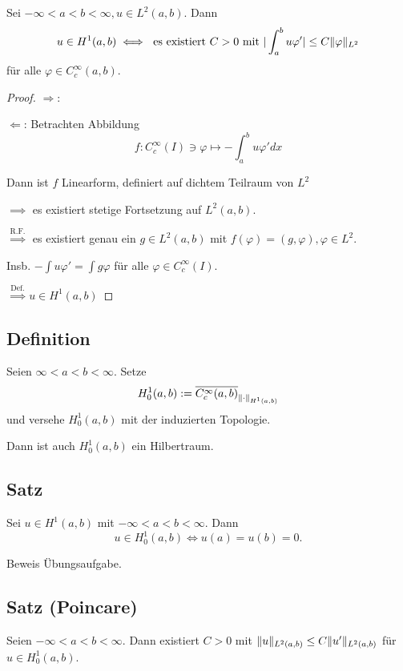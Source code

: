 Sei $-\infty < a < b < \infty, u \in L^2(a,b)$. 
Dann
$$
u \in H^1(a,b) \iff \text{ es existiert } C > 0 \text{ mit } |\int_a^b u\varphi'| \leq C \lVert \varphi \rVert_{L^2}$$
für alle $\varphi \in C_c^\infty(a,b)$.

\begin{proof}
  $\Rightarrow$: \checkmark

  $\Leftarrow$: Betrachten Abbildung
  $$
  f \colon C_c^\infty(I) \ni \varphi \mapsto -\int_a^b u \varphi' dx
  $$

  Dann ist $f$ Linearform, definiert auf dichtem Teilraum von $L^2$

  $\implies$ es existiert stetige Fortsetzung auf $L^2(a,b)$.

  $\overset{\text{R.F.}}{\implies}$ es existiert genau ein $g \in L^2(a,b)$ mit $f(\varphi) = (g,\varphi), \varphi \in L^2$.

  Insb. $-\int u \varphi' = \int g \varphi $ für alle $\varphi \in C_c^\infty(I)$.

  $\overset{\text{Def.}}{\implies} u \in H^1(a,b)$
\end{proof}

\subsection{Definition}

Seien $\infty < a < b < \infty$.
Setze
$$
H_0^1(a,b) := \overline{C_c^\infty(a,b)}_{\lVert \cdot \rVert_{H^1(a,b)}}
$$
und versehe $H_0^1(a,b)$ mit der induzierten Topologie.

\begin{bem}
  Dann ist auch $H_0^1(a,b)$ ein Hilbertraum.
\end{bem}

\subsection{Satz}

Sei $u \in H^1(a,b)$ mit $-\infty < a < b < \infty$.
Dann
$$ u \in H_0^1(a,b) \iff u(a) = u(b) = 0.$$

Beweis Übungsaufgabe.

\subsection{Satz (Poincare)}

Seien $-\infty < a < b < \infty$.
Dann existiert $C > 0$ mit $\lVert u \rVert_{L^2(a,b)} \leq C \lVert u' \rVert_{L^2(a,b)}$ für $u \in H_0^1(a,b)$.

